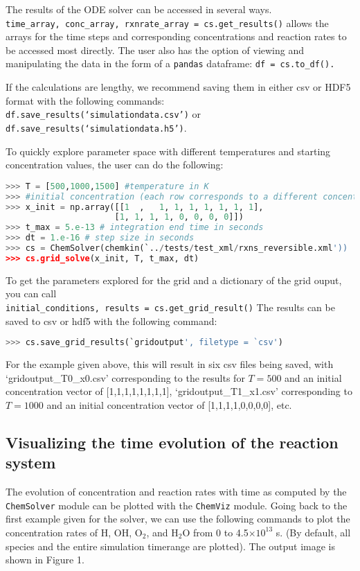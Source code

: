 \documentclass[12pt]{article}
\begin{document}
The results of the ODE solver can be accessed in several ways. \\
\texttt{time\_array, conc\_array, rxnrate\_array = cs.get\_results()}
allows the arrays for the time steps and corresponding concentrations and reaction rates to be accessed most directly. 
The user also has the option of viewing and manipulating the data in the form of a \texttt{pandas} dataframe: \texttt{df = cs.to\_df().}

If the calculations are lengthy, we recommend saving them in either csv or HDF5 format with the following commands:\\
\texttt{df.save\_results(`simulationdata.csv')} or \texttt{df.save\_results(`simulationdata.h5')}. 

To quickly explore parameter space with different temperatures and starting concentration values, the user can do the following: 

\begin{lstlisting}[language = Python, basicstyle = \ttfamily,columns = fullflexible, showstringspaces = False]
>>> T = [500,1000,1500] #temperature in K
>>> #initial concentration (each row corresponds to a different concentration vector)
>>> x_init = np.array([[1  ,   1, 1, 1, 1, 1, 1, 1],
                      [1, 1, 1, 1, 0, 0, 0, 0]]) 
>>> t_max = 5.e-13 # integration end time in seconds
>>> dt = 1.e-16 # step size in seconds
>>> cs = ChemSolver(chemkin(`../tests/test_xml/rxns_reversible.xml'))
>>> cs.grid_solve(x_init, T, t_max, dt)
\end{lstlisting}
To get the parameters explored for the grid and a dictionary of the grid ouput, you can call\\
\texttt{initial\_conditions, results = cs.get\_grid\_result()}
The results can be saved to csv or hdf5 with the following command: 
\begin{lstlisting}[language = Python, basicstyle = \ttfamily,columns = fullflexible, showstringspaces = False]
>>> cs.save_grid_results(`gridoutput', filetype = `csv')

\end{lstlisting}

For the example given above, this will result in six csv files being saved, with `gridoutput\_T0\_x0.csv' corresponding to the results for $T = 500$ and an initial concentration vector of [1,1,1,1,1,1,1,1], `gridoutput\_T1\_x1.csv' corresponding to $T = 1000$ and an initial concentration vector of [1,1,1,1,0,0,0,0], etc. 

\subsection{Visualizing the time evolution of the reaction system}
The evolution of concentration and reaction rates with time as computed by the \texttt{ChemSolver} module can be plotted with the \texttt{ChemViz} module. Going back to the first example given for the solver, we can use the following commands to plot the concentration rates of H, OH, O$_2$, and H$_2$O from 0 to 4.5$\times10^{13}$ s. (By default, all species and the entire simulation timerange are plotted). The output image is shown in Figure 1. 
\end{document}
